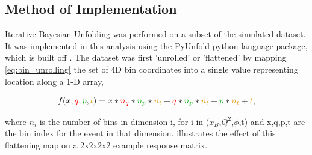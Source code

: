             
    
    \subsection{Method of Implementation}

        Iterative Bayesian Unfolding was performed on a subset of the simulated dataset. It was implemented in this analysis using the PyUnfold \parencite{Bourbeau2018PyUnfold:Unfolding} python language package, which is built off \parencite{DAgostini1995ATheorem}. The dataset was first 'unrolled' or 'flattened' by mapping \ref{eq:bin_unrolling} the set of 4D bin coordinates into a single value representing location along a 1-D array,
    
    \begin{equation}
        {f(\textcolor{black}{x},\textcolor{red}{q},\textcolor{darkgreen}{p},\textcolor{darkorange}{t}) = \textcolor{black}{x}*\textcolor{red}{n_q}*\textcolor{darkgreen}{n_p}*\textcolor{darkorange}{n_t} + \textcolor{red}{q}*\textcolor{darkgreen}{n_p}*\textcolor{darkorange}{n_t} + \textcolor{darkgreen}{p}*\textcolor{darkorange}{n_t} + \textcolor{darkorange}{t}},
    \end{equation}\label{eq:bin_unrolling}

        where $n_i$ is the number of bins in dimension i, for i in ($x_B$,$Q^2$,$\phi$,t) and x,q,p,t are the bin index for the event in that dimension.  illustrates the effect of this flattening map on a 2x2x2x2 example response matrix. 

